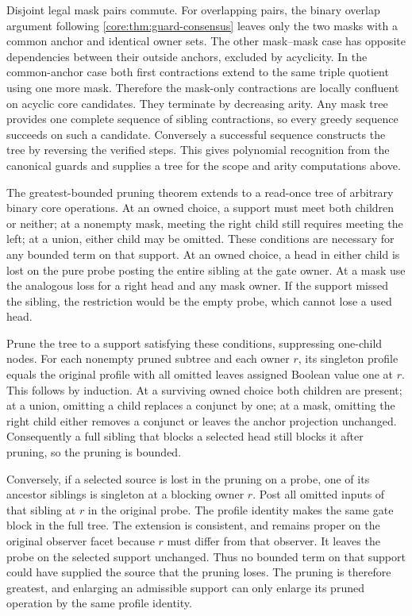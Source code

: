Disjoint legal mask pairs commute. For overlapping pairs,
the binary overlap argument following
\cref{core:thm:guard-consensus} leaves only the two masks
with a common anchor and identical owner sets. The other
mask--mask case has opposite dependencies between their
outside anchors, excluded by acyclicity. In the common-anchor
case both first contractions extend to the same triple
quotient using one more mask. Therefore the mask-only
contractions are locally confluent on acyclic core candidates.
They terminate by decreasing arity. Any mask tree provides
one complete sequence of sibling contractions, so every
greedy sequence succeeds on such a candidate. Conversely
a successful sequence constructs the tree by reversing the
verified steps. This gives polynomial recognition from the
canonical guards and supplies a tree for the scope and
arity computations above.

The greatest-bounded pruning theorem extends to a read-once
tree of arbitrary binary core operations. At an owned choice,
a support must meet both children or neither; at a nonempty
mask, meeting the right child still requires meeting the
left; at a union, either child may be omitted. These conditions
are necessary for any bounded term on that support. At an
owned choice, a head in either child is lost on the pure probe
posting the entire sibling at the gate owner. At a mask use
the analogous loss for a right head and any mask owner.
If the support missed the sibling, the restriction would be
the empty probe, which cannot lose a used head.

Prune the tree to a support satisfying these conditions,
suppressing one-child nodes. For each nonempty pruned
subtree and each owner $r$, its singleton profile equals
the original profile with all omitted leaves assigned
Boolean value one at $r$. This follows by induction. At
a surviving owned choice both children are present;
at a union, omitting a child replaces a conjunct by one;
at a mask, omitting the right child either removes a
conjunct or leaves the anchor projection unchanged.
Consequently a full sibling that blocks a selected head
still blocks it after pruning, so the pruning is bounded.

Conversely, if a selected source is lost in the pruning
on a probe, one of its ancestor siblings is singleton at
a blocking owner $r$. Post all omitted inputs of that
sibling at $r$ in the original probe. The profile identity
makes the same gate block in the full tree. The extension
is consistent, and remains proper on the original observer
facet because $r$ must differ from that observer. It leaves
the probe on the selected support unchanged. Thus no
bounded term on that support could have supplied the
source that the pruning loses. The pruning is therefore
greatest, and enlarging an admissible support can only
enlarge its pruned operation by the same profile identity.

